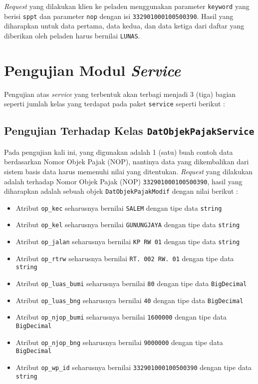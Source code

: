 \textit{Request} yang dilakukan klien ke peladen menggunakan parameter \texttt{keyword} yang berisi \texttt{sppt} dan parameter \texttt{nop} dengan isi \texttt{332901000100500390}. Hasil yang diharapkan untuk data pertama, data kedua, dan data ketiga dari daftar yang diberikan oleh peladen harus bernilai \texttt{LUNAS}.

\section{Pengujian Modul \textit{Service}}

Pengujian atas \textit{service} yang terbentuk akan terbagi menjadi 3 (tiga) bagian seperti jumlah kelas yang terdapat pada paket \texttt{service} seperti berikut :

\subsection{Pengujian Terhadap Kelas \texttt{DatObjekPajakService}}

Pada pengujian kali ini, yang digunakan adalah 1 (satu) buah contoh data berdasarkan Nomor Objek Pajak (NOP), nantinya data yang dikembalikan dari sistem basis data harus memenuhi nilai yang ditentukan. \textit{Request} yang dilakukan adalah terhadap Nomor Objek Pajak (NOP) \texttt{332901000100500390}, hasil yang diharapkan adalah sebuah objek \texttt{DatObjekPajakModif} dengan nilai berikut :

\begin{itemize}
	\item Atribut \texttt{op\_kec} seharusnya bernilai \texttt{SALEM} dengan tipe data \texttt{string}
	\item Atribut \texttt{op\_kel} seharusnya bernilai \texttt{GUNUNGJAYA} dengan tipe data \texttt{string}
	\item Atribut \texttt{op\_jalan} seharusnya bernilai \texttt{KP RW 01} dengan tipe data \texttt{string}
	\item Atribut \texttt{op\_rtrw} seharusnya bernilai \texttt{RT. 002 RW. 01} dengan tipe data \texttt{string}
	\item Atribut \texttt{op\_luas\_bumi} seharusnya bernilai \texttt{80} dengan tipe data \texttt{BigDecimal}
	\item Atribut \texttt{op\_luas\_bng} seharusnya bernilai \texttt{40} dengan tipe data \texttt{BigDecimal}
	\item Atribut \texttt{op\_njop\_bumi} seharusnya bernilai \texttt{1600000} dengan tipe data \texttt{BigDecimal}
	\item Atribut \texttt{op\_njop\_bng} seharusnya bernilai \texttt{9000000} dengan tipe data \texttt{BigDecimal}
	\item Atribut \texttt{op\_wp\_id} seharusnya bernilai \texttt{332901000100500390} dengan tipe data \texttt{string}
\end{itemize}

